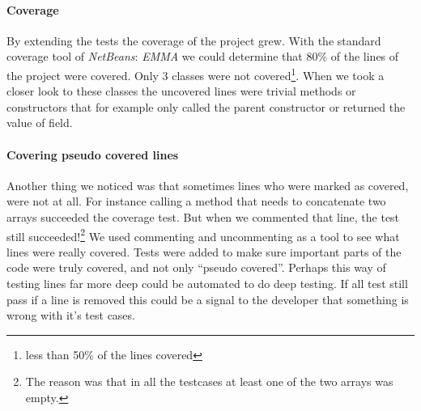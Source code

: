
\paragraph{Coverage}

By extending the tests the coverage of the project grew. With the standard coverage tool of \textit{NetBeans}: \textit{EMMA} we could determine that 80\% of the lines of the project were covered. Only 3 classes were not covered\footnote{less than 50\% of the lines covered}. When we took a closer look to these classes the uncovered lines were trivial methods or constructors that for example only called the parent constructor or returned the value of field.

\paragraph{Covering pseudo covered lines}Another thing we noticed was that sometimes lines who were marked as covered, were not at all. For instance calling a method that needs to concatenate two arrays succeeded the coverage test. But when we commented that line, the test still succeeded!\footnote{The reason was that in all the testcases at least one of the two arrays was empty.} We used commenting and uncommenting as a tool to see what lines were really covered. Tests were added to make sure important parts of the code were truly covered, and not only ``pseudo covered''. Perhaps this way of testing lines far more deep could be automated to do deep testing. If all test still pass if a line is removed this could be a signal to the developer that something is wrong with it's test cases.